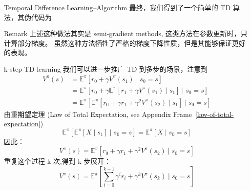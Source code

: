 \documentclass[aspectratio=169]{beamer}
\begin{document}
\begin{frame}{Temporal Difference Learning--Algorithm}
    最终，我们得到了一个简单的 TD 算法，其伪代码为
    \begin{algorithm}[H]
        \caption{Value function approximation with TD}
    \end{algorithm}
    \begin{block}{Remark}
        上述这种做法其实是 semi-gradient methods, 这类方法在参数更新时，只计算部分梯度。
        虽然这种方法牺牲了严格的梯度下降性质，但是其能够保证更好的表现。
    \end{block}
\end{frame}

\begin{frame}{k-step TD learning}
    我们可以进一步推广 TD 到多步的场景，注意到
    \begin{align}
    V^\pi(s) &=\mathbb{E}^\pi[r_0 + \gamma V^\pi(s_1)\mid s_0=s]\\
    &=\mathbb{E}^\pi[r_0 + \gamma \mathbb{E}^\pi[r_1 + \gamma V^\pi(s_1)\mid s_1]\mid s_0=s]\\
    &= \mathbb{E}^\pi[\mathbb{E}^\pi[r_0 + \gamma r_1 + \gamma^2 V^\pi(s_2) \mid s_1] \mid s_0=s] 
    \end{align}
    由重期望定理 (Law of Total Expectation, see Appendix Frame~\ref{law-of-total-expectation})
    \begin{equation}
    \mathbb{E}^\pi[\mathbb{E}^\pi[X \mid s_1] \mid s_0=s] = \mathbb{E}^\pi[X \mid s_0=s]
    \end{equation}
    因此：
    \begin{equation}
    V^\pi(s) = \mathbb{E}^\pi[r_0 + \gamma r_1 + \gamma^2 V^\pi(s_2) \mid s_0=s]
    \end{equation}
    重复这个过程 k 次,得到 k 步展开：
    \begin{equation} 
        V^\pi(s) = \mathbb{E}^\pi\left[\sum_{i=0}^{k-1} \gamma^i r_i + \gamma^k V^\pi(s_k) \mid s_0=s\right]
    \end{equation}
\end{frame}
\end{document}
